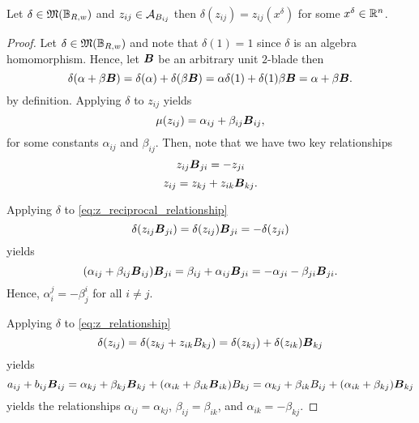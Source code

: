 \begin{lemma}
Let $\delta \in \mathfrak{M}(\mathbb{B}_{R,w})$ and $z_{ij} \in \mathcal{A}_{B_{ij}}$ then $\delta(z_{ij})=z_{ij}(x^\delta)$ for some $x^\delta \in \mathbb{R}^n$.
\end{lemma}
\begin{proof}
Let $\delta \in \mathfrak{M}(\mathbb{B}_{R,w})$ and note that $\delta(1)=1$ since $\delta$ is an algebra homomorphism. Hence, let $\boldsymbol{B}$ be an arbitrary unit $2$-blade then 
\begin{equation}
\delta(\alpha + \beta \boldsymbol{B}) = \delta(\alpha) + \delta(\beta \boldsymbol{B})=\alpha \delta(1) + \delta(1)\beta \boldsymbol{B} = \alpha + \beta \boldsymbol{B}.
\end{equation}
by definition. Applying $\delta$ to $z_{ij}$ yields
\begin{equation}
\mu(z_{ij}) = \alpha_{ij} + \beta_{ij} \boldsymbol{B}_{ij},
\end{equation}
for some constants $\alpha_{ij}$ and $\beta_{ij}$. Then, note that we have two key relationships
\begin{equation}
\label{eq:z_reciprocal_relationship}
z_{ij} \boldsymbol{B}_{ji}  = -z_{ji}
\end{equation}
\begin{equation}
\label{eq:z_relationship}
z_{ij} = z_{kj} + z_{ik} \boldsymbol{B}_{kj}.
\end{equation}

Applying $\delta$ to \cref{eq:z_reciprocal_relationship}
\begin{equation}
\delta(z_{ij} \boldsymbol{B}_{ji}) = \delta(z_{ij}) \boldsymbol{B}_{ji} = -\delta(z_{ji})
\end{equation}
yields
\begin{equation}
(\alpha_{ij} + \beta_{ij} \boldsymbol{B}_{ij})\boldsymbol{B}_{ji} = \beta_{ij} + \alpha_{ij} \boldsymbol{B}_{ji} = - \alpha_{ji} - \beta_{ji} \boldsymbol{B}_{ji}.
\end{equation}
Hence, $\alpha_i^j = -\beta_j^i$ for all $i \neq j$.

Applying $\delta$ to \cref{eq:z_relationship}
\begin{equation}
\delta(z_{ij}) = \delta(z_{kj} + z_{ik} B_{kj}) = \delta(z_{kj})+\delta(z_{ik})\boldsymbol{B}_{kj}
\end{equation}
yields
\begin{equation}
a_{ij} + b_{ij} \boldsymbol{B}_{ij} = \alpha_{kj} + \beta_{kj} \boldsymbol{B}_{kj} + (\alpha_{ik} + \beta_{ik} \boldsymbol{B}_{ik})B_{kj} = \alpha_{kj} + \beta_{ik} B_{ij} + (\alpha_{ik} + \beta_{kj})\boldsymbol{B}_{kj}
\end{equation}
yields the relationships $\alpha_{ij} = \alpha_{kj}$, $\beta_{ij} = \beta_{ik}$, and $\alpha_{ik}=-\beta_{kj}$.


\end{proof}
